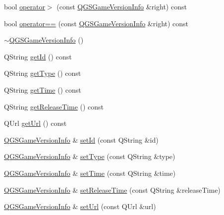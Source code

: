 \begin{DoxyCompactItemize}
bool \mbox{\hyperlink{class_q_g_s_game_version_info_a5dc635086c504bc5d802a4eb16f8c0ab}{operator$>$}} (const \mbox{\hyperlink{class_q_g_s_game_version_info}{Q\+G\+S\+Game\+Version\+Info}} \&right) const
\item 
bool \mbox{\hyperlink{class_q_g_s_game_version_info_a502f8be8831d769a149a169408b16817}{operator==}} (const \mbox{\hyperlink{class_q_g_s_game_version_info}{Q\+G\+S\+Game\+Version\+Info}} \&right) const
\item 
\mbox{\hyperlink{class_q_g_s_game_version_info_af147570d7b9d6243408549b600e411d9}{$\sim$\+Q\+G\+S\+Game\+Version\+Info}} ()
\item 
Q\+String \mbox{\hyperlink{class_q_g_s_game_version_info_a28923ee1c1e3b0cc33f6c3f5a04d92ef}{get\+Id}} () const
\item 
Q\+String \mbox{\hyperlink{class_q_g_s_game_version_info_ab995f7ca3678737dc0c149a982ad0866}{get\+Type}} () const
\item 
Q\+String \mbox{\hyperlink{class_q_g_s_game_version_info_af18a236748fa3843912d8339800bf8e6}{get\+Time}} () const
\item 
Q\+String \mbox{\hyperlink{class_q_g_s_game_version_info_a6f6a3391f62172f01af1395a7a1400c2}{get\+Release\+Time}} () const
\item 
Q\+Url \mbox{\hyperlink{class_q_g_s_game_version_info_a1f2fa243f274baf7819f16c79c9cf401}{get\+Url}} () const
\item 
\mbox{\hyperlink{class_q_g_s_game_version_info}{Q\+G\+S\+Game\+Version\+Info}} \& \mbox{\hyperlink{class_q_g_s_game_version_info_a995d554639b98af806af69f17589e4a3}{set\+Id}} (const Q\+String \&id)
\item 
\mbox{\hyperlink{class_q_g_s_game_version_info}{Q\+G\+S\+Game\+Version\+Info}} \& \mbox{\hyperlink{class_q_g_s_game_version_info_aa320d2d4f2d8141f008092481bd9c0c0}{set\+Type}} (const Q\+String \&type)
\item 
\mbox{\hyperlink{class_q_g_s_game_version_info}{Q\+G\+S\+Game\+Version\+Info}} \& \mbox{\hyperlink{class_q_g_s_game_version_info_a75c40d09d18eb963e3f8ce0892005278}{set\+Time}} (const Q\+String \&time)
\item 
\mbox{\hyperlink{class_q_g_s_game_version_info}{Q\+G\+S\+Game\+Version\+Info}} \& \mbox{\hyperlink{class_q_g_s_game_version_info_aaa73501233b83936281c35aaa3f48b65}{set\+Release\+Time}} (const Q\+String \&release\+Time)
\item 
\mbox{\hyperlink{class_q_g_s_game_version_info}{Q\+G\+S\+Game\+Version\+Info}} \& \mbox{\hyperlink{class_q_g_s_game_version_info_a36f50364d5a01a024644a589ee7ed11b}{set\+Url}} (const Q\+Url \&url)
\end{DoxyCompactItemize}


